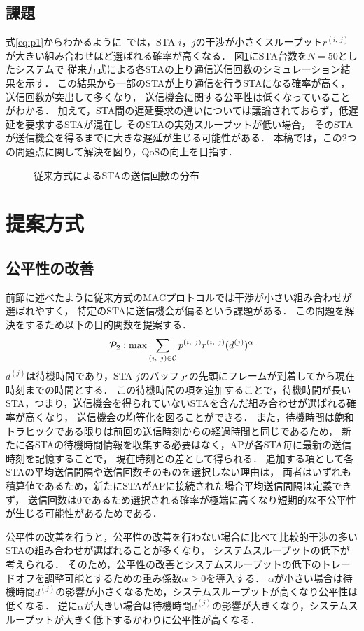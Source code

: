 \documentclass[technicalreport]{ieicej}
\newcommand{\sij}{(i,\ j)}
\newcommand{\rij}{r^{\sij}}
\begin{document}
	\subsection{課題}
		式\eqref{eq:p1}からわかるように~\cite{promac}では，STA $i$，$j$の干渉が小さくスループット$\rij$が大きい組み合わせほど選ばれる確率が高くなる．
		図\ref{fig:numtx}にSTA台数を$N=50$としたシステムで
		従来方式による各STAの上り通信送信回数のシミュレーション結果を示す．
		この結果から一部のSTAが上り通信を行うSTAになる確率が高く，送信回数が突出して多くなり，
		送信機会に関する公平性は低くなっていることがわかる．
		加えて，STA間の遅延要求の違いについては議論されておらず，低遅延を要求するSTAが混在し
		そのSTAの実効スループットが低い場合，
		そのSTAが送信機会を得るまでに大きな遅延が生じる可能性がある．
		本稿では，この2つの問題点に関して解決を図り，QoSの向上を目指す．

		\begin{figure}[t]
			\centering
			\caption{従来方式によるSTAの送信回数の分布}
			\label{fig:numtx}
		\end{figure}

\section{提案方式}
\subsection{公平性の改善}\label{sec:fair}
	前節に述べたように従来方式のMACプロトコルでは干渉が小さい組み合わせが選ばれやすく，
	特定のSTAに送信機会が偏るという課題がある．
	この問題を解決をするため以下の目的関数を提案する．
	\begin{equation}
		{\mathcal P}_2: {\rm max} \sum_{(i,\ j)\in{\mathcal C}} p^{(i,\ j)}r^{(i,\ j)}(d^{(j)})^{\alpha} \label{eq:p2}
	\end{equation}
	$d^{(j)}$は待機時間であり，STA $j$のバッファの先頭にフレームが到着してから現在時刻までの時間とする．
	この待機時間の項を追加することで，待機時間が長いSTA，つまり，送信機会を得られていないSTAを含んだ組み合わせが選ばれる確率が高くなり，
	送信機会の均等化を図ることができる．
	また，待機時間は飽和トラヒックである限りは前回の送信時刻からの経過時間と同じであるため，
	新たに各STAの待機時間情報を収集する必要はなく，APが各STA毎に最新の送信時刻を記憶することで，
	現在時刻との差として得られる．
	追加する項として各STAの平均送信間隔や送信回数そのものを選択しない理由は，
	両者はいずれも積算値であるため，新たにSTAがAPに接続された場合平均送信間隔は定義できず，
	送信回数は0であるため選択される確率が極端に高くなり短期的な不公平性が生じる可能性があるためである．
	\par
	公平性の改善を行うと，公平性の改善を行わない場合に比べて比較的干渉の多いSTAの組み合わせが選ばれることが多くなり，
	システムスループットの低下が考えられる．
	そのため，公平性の改善とシステムスループットの低下のトレードオフを調整可能とするための重み係数$\alpha\geq 0$を導入する．
	$\alpha$が小さい場合は待機時間$d^{(j)}$の影響が小さくなるため，システムスループットが高くなり公平性は低くなる．
	逆に$\alpha$が大きい場合は待機時間$d^{(j)}$の影響が大きくなり，システムスループットが大きく低下するかわりに公平性が高くなる．
\end{document}
